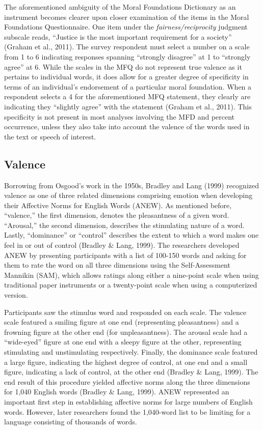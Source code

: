 \documentclass[english,,man]{apa6}
\begin{document}
The aforementioned ambiguity of the Moral Foundations Dictionary as an instrument becomes clearer upon closer examination of the items in the Moral Foundations Questionnaire. One item under the \emph{fairness/reciprocity} judgment subscale reads, \enquote{Justice is the most important requirement for a society} (Graham et al., 2011). The survey respondent must select a number on a scale from 1 to 6 indicating responses spanning \enquote{strongly disagree} at 1 to \enquote{strongly agree} at 6. While the scales in the MFQ do not represent true valence as it pertains to individual words, it does allow for a greater degree of specificity in terms of an individual's endorsement of a particular moral foundation. When a respondent selects a 4 for the aforementioned MFQ statement, they clearly are indicating they \enquote{slightly agree} with the statement (Graham et al., 2011). This specificity is not present in most analyses involving the MFD and percent occurrence, unless they also take into account the valence of the words used in the text or speech of interest.

\hypertarget{valence}{%
\subsection{Valence}\label{valence}}

Borrowing from Osgood's work in the 1950s, Bradley and Lang (1999) recognized valence as one of three related dimensions comprising emotion when developing their Affective Norms for English Words (ANEW). As mentioned before, \enquote{valence,} the first dimension, denotes the pleasantness of a given word. \enquote{Arousal,} the second dimension, describes the stimulating nature of a word. Lastly, \enquote{dominance} or \enquote{control} describes the extent to which a word makes one feel in or out of control (Bradley \& Lang, 1999). The researchers developed ANEW by presenting participants with a list of 100-150 words and asking for them to rate the word on all three dimensions using the Self-Assessment Mannikin (SAM), which allows ratings along either a nine-point scale when using traditional paper instruments or a twenty-point scale when using a computerized version.

Participants saw the stimulus word and responded on each scale. The valence scale featured a smiling figure at one end (representing pleasantness) and a frowning figure at the other end (for unpleasantness). The arousal scale had a \enquote{wide-eyed} figure at one end with a sleepy figure at the other, representing stimulating and unstimulating respectively. Finally, the dominance scale featured a large figure, indicating the highest degree of control, at one end and a small figure, indicating a lack of control, at the other end (Bradley \& Lang, 1999). The end result of this procedure yielded affective norms along the three dimensions for 1,040 English words (Bradley \& Lang, 1999). ANEW represented an important first step in establishing affective norms for large numbers of English words. However, later researchers found the 1,040-word list to be limiting for a language consisting of thousands of words.
\end{document}
